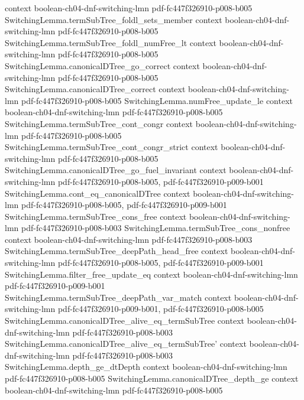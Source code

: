 \begin{lemma}
  {context}
  {boolean-ch04-dnf-switching-lmn}
  {pdf-fc447f326910-p008-b005}
\proofstep
  {SwitchingLemma.termSubTree_foldl_sets_member}
  {context}
  {boolean-ch04-dnf-switching-lmn}
  {pdf-fc447f326910-p008-b005}
\proofstep
  {SwitchingLemma.termSubTree_foldl_numFree_lt}
  {context}
  {boolean-ch04-dnf-switching-lmn}
  {pdf-fc447f326910-p008-b005}
\proofstep
  {SwitchingLemma.canonicalDTree_go_correct}
  {context}
  {boolean-ch04-dnf-switching-lmn}
  {pdf-fc447f326910-p008-b005}
\proofstep
  {SwitchingLemma.canonicalDTree_correct}
  {context}
  {boolean-ch04-dnf-switching-lmn}
  {pdf-fc447f326910-p008-b005}
\proofstep
  {SwitchingLemma.numFree_update_le}
  {context}
  {boolean-ch04-dnf-switching-lmn}
  {pdf-fc447f326910-p008-b005}
\proofstep
  {SwitchingLemma.termSubTree_cont_congr}
  {context}
  {boolean-ch04-dnf-switching-lmn}
  {pdf-fc447f326910-p008-b005}
\proofstep
  {SwitchingLemma.termSubTree_cont_congr_strict}
  {context}
  {boolean-ch04-dnf-switching-lmn}
  {pdf-fc447f326910-p008-b005}
\proofstep
  {SwitchingLemma.canonicalDTree_go_fuel_invariant}
  {context}
  {boolean-ch04-dnf-switching-lmn}
  {pdf-fc447f326910-p008-b005,
    pdf-fc447f326910-p009-b001}
\proofstep
  {SwitchingLemma.cont_eq_canonicalDTree}
  {context}
  {boolean-ch04-dnf-switching-lmn}
  {pdf-fc447f326910-p008-b005,
    pdf-fc447f326910-p009-b001}
\proofstep
  {SwitchingLemma.termSubTree_cons_free}
  {context}
  {boolean-ch04-dnf-switching-lmn}
  {pdf-fc447f326910-p008-b003}
\proofstep
  {SwitchingLemma.termSubTree_cons_nonfree}
  {context}
  {boolean-ch04-dnf-switching-lmn}
  {pdf-fc447f326910-p008-b003}
\proofstep
  {SwitchingLemma.termSubTree_deepPath_head_free}
  {context}
  {boolean-ch04-dnf-switching-lmn}
  {pdf-fc447f326910-p008-b005,
    pdf-fc447f326910-p009-b001}
\proofstep
  {SwitchingLemma.filter_free_update_eq}
  {context}
  {boolean-ch04-dnf-switching-lmn}
  {pdf-fc447f326910-p009-b001}
\proofstep
  {SwitchingLemma.termSubTree_deepPath_var_match}
  {context}
  {boolean-ch04-dnf-switching-lmn}
  {pdf-fc447f326910-p009-b001,
    pdf-fc447f326910-p008-b005}
\proofstep
  {SwitchingLemma.canonicalDTree_alive_eq_termSubTree}
  {context}
  {boolean-ch04-dnf-switching-lmn}
  {pdf-fc447f326910-p008-b003}
\proofstep
  {SwitchingLemma.canonicalDTree_alive_eq_termSubTree'}
  {context}
  {boolean-ch04-dnf-switching-lmn}
  {pdf-fc447f326910-p008-b003}
\proofstep
  {SwitchingLemma.depth_ge_dtDepth}
  {context}
  {boolean-ch04-dnf-switching-lmn}
  {pdf-fc447f326910-p008-b005}
\proofstep
  {SwitchingLemma.canonicalDTree_depth_ge}
  {context}
  {boolean-ch04-dnf-switching-lmn}
  {pdf-fc447f326910-p008-b005}

\end{lemma}

